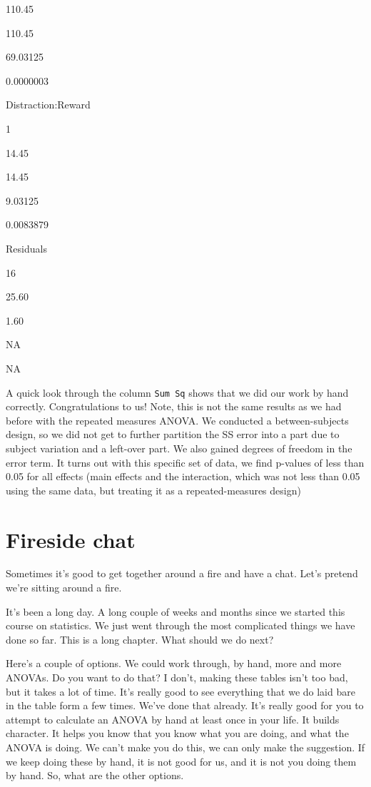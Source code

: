 \documentclass[]{book}
\begin{document}
110.45

110.45

69.03125

0.0000003

Distraction:Reward

1

14.45

14.45

9.03125

0.0083879

Residuals

16

25.60

1.60

NA

NA

A quick look through the column \texttt{Sum\ Sq} shows that we did our work by hand correctly. Congratulations to us! Note, this is not the same results as we had before with the repeated measures ANOVA. We conducted a between-subjects design, so we did not get to further partition the SS error into a part due to subject variation and a left-over part. We also gained degrees of freedom in the error term. It turns out with this specific set of data, we find p-values of less than 0.05 for all effects (main effects and the interaction, which was not less than 0.05 using the same data, but treating it as a repeated-measures design)

\hypertarget{fireside-chat}{%
\section{Fireside chat}\label{fireside-chat}}

Sometimes it's good to get together around a fire and have a chat. Let's pretend we're sitting around a fire.

It's been a long day. A long couple of weeks and months since we started this course on statistics. We just went through the most complicated things we have done so far. This is a long chapter. What should we do next?

Here's a couple of options. We could work through, by hand, more and more ANOVAs. Do you want to do that? I don't, making these tables isn't too bad, but it takes a lot of time. It's really good to see everything that we do laid bare in the table form a few times. We've done that already. It's really good for you to attempt to calculate an ANOVA by hand at least once in your life. It builds character. It helps you know that you know what you are doing, and what the ANOVA is doing. We can't make you do this, we can only make the suggestion. If we keep doing these by hand, it is not good for us, and it is not you doing them by hand. So, what are the other options.
\end{document}
